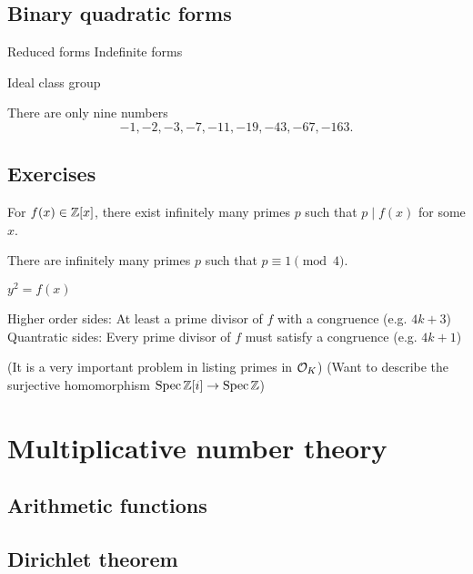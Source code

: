 \documentclass{../../large}
\begin{document}
\section{Binary quadratic forms}
{Reduced forms}
{Indefinite forms}

{Ideal class group}

\begin{prb}
There are only nine numbers
\[-1,-2,-3,-7,-11,-19,-43,-67,-163.\]
\end{prb}



\section*{Exercises}
\begin{prb}
\begin{parts}
\item For $f(x)\in\mathbb{Z}[x]$, there exist infinitely many primes $p$ such that $p\mid f(x)$ for some $x$.
\item There are infinitely many primes $p$ such that $p\equiv1\pmod4$.
\end{parts}
\end{prb}

\begin{prb}
$y^2=f(x)$

Higher order sides: At least a prime divisor of $f$ with a congruence (e.g. $4k+3$)
Quantratic sides: Every prime divisor of $f$ must satisfy a congruence (e.g. $4k+1$)
\end{prb}


\begin{prb}
(It is a very important problem in listing primes in $\mathcal{O}_K$)
(Want to describe the surjective homomorphism $\operatorname{Spec}\mathbb{Z}[i]\to\operatorname{Spec}\mathbb{Z}$)
\end{prb}







\chapter{Multiplicative number theory}
\section{Arithmetic functions}
\section{Dirichlet theorem}
\end{document}
